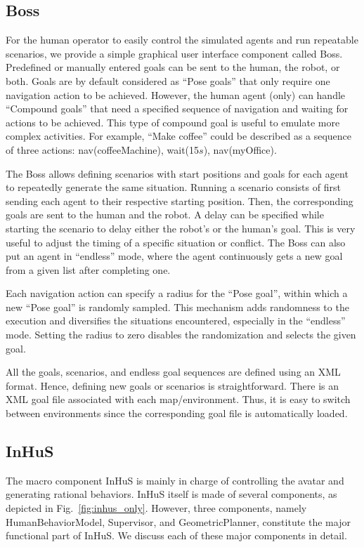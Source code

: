 \subsection{Boss}
For the human operator to easily control the simulated agents and run repeatable scenarios, we provide a simple graphical user interface component called Boss. Predefined or manually entered goals can be sent to the human, the robot, or both. Goals are by default considered as ``Pose goals'' that only require one navigation action to be achieved. However, the human agent (only) can handle ``Compound goals'' that need a specified sequence of navigation and waiting for actions to be achieved. This type of compound goal is useful to emulate more complex activities. For example, ``Make coffee'' could be described as a sequence of three actions: nav(coffeeMachine), wait(15$s$), nav(myOffice).

The Boss allows defining scenarios with start positions and goals for each agent to repeatedly generate the same situation. 
Running a scenario consists of first sending each agent to their respective starting position. Then, the corresponding goals are sent to the human and the robot.
A delay can be specified while starting the scenario to delay either the robot's or the human's goal. This is very useful to adjust the timing of a specific situation or conflict. The Boss can also put an agent in ``endless'' mode, where the agent continuously gets a new goal from a given list after completing one. 

Each navigation action can specify a radius for the ``Pose goal'', within which a new ``Pose goal'' is randomly sampled. This mechanism adds randomness to the execution and diversifies the situations encountered, especially in the ``endless'' mode. Setting the radius to zero disables the randomization and selects the given goal.

All the goals, scenarios, and endless goal sequences are defined using an XML format. Hence, defining new goals or scenarios is straightforward. There is an XML goal file associated with each map/environment. Thus, it is easy to switch between environments since the corresponding goal file is automatically loaded.


\subsection{InHuS}



The macro component InHuS is mainly in charge of controlling the avatar and generating rational behaviors. InHuS itself is made of several components, as depicted in Fig.~\ref{fig:inhus_only}. However, three components, namely HumanBehaviorModel, Supervisor, and GeometricPlanner, constitute the major functional part of InHuS. We discuss each of these major components in detail.

